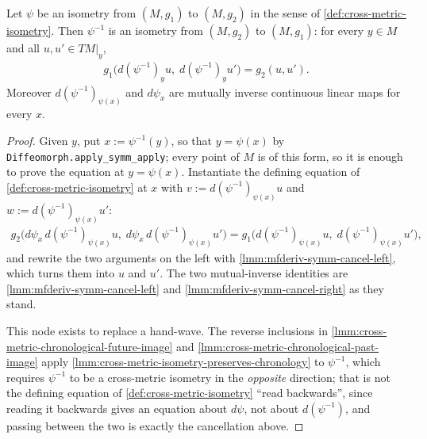 \begin{lemma}
    \label{lmm:cross-metric-isometry-symm}
    Let $\psi$ be an isometry from $(M,g_1)$ to $(M,g_2)$ in the sense of \ref{def:cross-metric-isometry}. Then $\psi^{-1}$ is an isometry from $(M,g_2)$ to $(M,g_1)$: for every $y \in M$ and all $u, u' \in TM|_y$,
    \begin{align}
        g_1\big(d(\psi^{-1})_y u,\; d(\psi^{-1})_y u'\big) = g_2(u, u').
    \end{align}
    Moreover $d(\psi^{-1})_{\psi(x)}$ and $d\psi_x$ are mutually inverse continuous linear maps for every $x$.
\end{lemma}
\begin{proof}
    Given $y$, put $x := \psi^{-1}(y)$, so that $y = \psi(x)$ by \texttt{Diffeomorph.apply\_symm\_apply}; every point of $M$ is of this form, so it is enough to prove the equation at $y = \psi(x)$. Instantiate the defining equation of \ref{def:cross-metric-isometry} at $x$ with $v := d(\psi^{-1})_{\psi(x)}u$ and $w := d(\psi^{-1})_{\psi(x)}u'$:
    \begin{align}
        g_2\big(d\psi_x\,d(\psi^{-1})_{\psi(x)}u,\; d\psi_x\,d(\psi^{-1})_{\psi(x)}u'\big) = g_1\big(d(\psi^{-1})_{\psi(x)}u,\; d(\psi^{-1})_{\psi(x)}u'\big),
    \end{align}
    and rewrite the two arguments on the left with \ref{lmm:mfderiv-symm-cancel-left}, which turns them into $u$ and $u'$. The two mutual-inverse identities are \ref{lmm:mfderiv-symm-cancel-left} and \ref{lmm:mfderiv-symm-cancel-right} as they stand.

    This node exists to replace a hand-wave. The reverse inclusions in \ref{lmm:cross-metric-chronological-future-image} and \ref{lmm:cross-metric-chronological-past-image} apply \ref{lmm:cross-metric-isometry-preserves-chronology} to $\psi^{-1}$, which requires $\psi^{-1}$ to be a cross-metric isometry in the \emph{opposite} direction; that is not the defining equation of \ref{def:cross-metric-isometry} ``read backwards'', since reading it backwards gives an equation about $d\psi$, not about $d(\psi^{-1})$, and passing between the two is exactly the cancellation above.
\end{proof}

